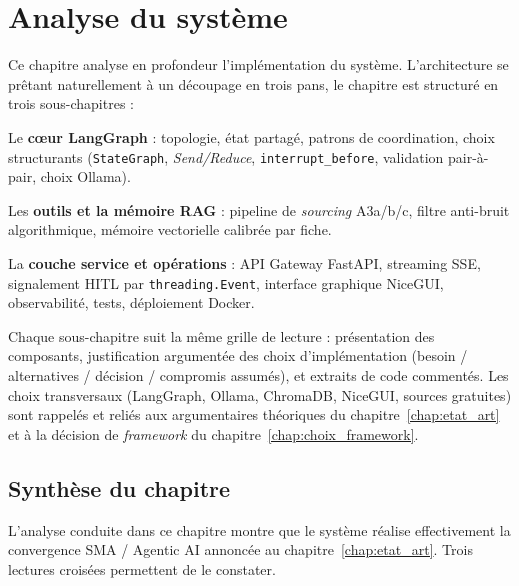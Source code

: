 \chapter{Analyse du système}
\label{chap:analyse_systeme}

Ce chapitre analyse en profondeur l'implémentation du système. L'architecture se prêtant naturellement à un découpage en trois pans, le chapitre est structuré en trois sous-chapitres :

\begin{description}[leftmargin=1.4cm,style=nextline]
\item[\S~5.A] Le \textbf{cœur LangGraph} : topologie, état partagé, patrons de coordination, choix structurants (\texttt{StateGraph}, \emph{Send/Reduce}, \texttt{interrupt\_before}, validation pair-à-pair, choix Ollama).
\item[\S~5.B] Les \textbf{outils et la mémoire RAG} : pipeline de \emph{sourcing} A3a/b/c, filtre anti-bruit algorithmique, mémoire vectorielle calibrée par fiche.
\item[\S~5.C] La \textbf{couche service et opérations} : API Gateway FastAPI, streaming SSE, signalement HITL par \texttt{threading.Event}, interface graphique NiceGUI, observabilité, tests, déploiement Docker.
\end{description}

Chaque sous-chapitre suit la même grille de lecture : présentation des composants, justification argumentée des choix d'implémentation (besoin / alternatives / décision / compromis assumés), et extraits de code commentés. Les choix transversaux (LangGraph, Ollama, ChromaDB, NiceGUI, sources gratuites) sont rappelés et reliés aux argumentaires théoriques du chapitre~\ref{chap:etat_art} et à la décision de \emph{framework} du chapitre~\ref{chap:choix_framework}.





\section{Synthèse du chapitre}

L'analyse conduite dans ce chapitre montre que le système réalise effectivement la convergence SMA / Agentic AI annoncée au chapitre~\ref{chap:etat_art}. Trois lectures croisées permettent de le constater.


